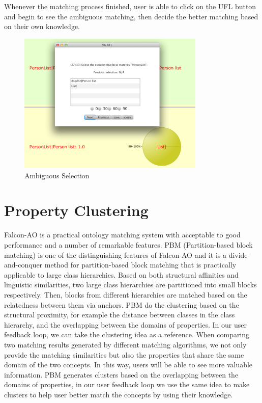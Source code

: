 Whenever the matching process finished, user is able to click on the UFL button and begin to see the ambiguous matching, then decide the better matching based on their own knowledge.

\begin{figure}[htb]
	\centering
	\includegraphics[width=3.5in]{pics/ufl.png}
	\caption{Ambiguous Selection}
	\label{fig:ambiguous_selection}
\end{figure}

\section{Property Clustering} %
\label{sub:property_clustering}
Falcon-AO \cite{hu2008falcon} is a practical ontology matching system with acceptable to good performance and a number of remarkable features. PBM (Partition-based block matching) is one of the distinguishing features of Falcon-AO and it is a divide-and-conquer method for partition-based block matching that is practically applicable to large class hierarchies. Based on both structural affinities and linguistic similarities, two large class hierarchies are partitioned into small blocks respectively. Then, blocks from different hierarchies are matched based on the relatedness between them via anchors. PBM do the clustering based on the structural proximity, for example the distance between classes in the class hierarchy, and the overlapping between the domains of properties. In our user feedback loop, we can take the clustering idea as a reference. When comparing two matching results generated by different matching algorithms, we not only provide the matching similarities but also the properties that share the same domain of the two concepts. In this way, users will be able to see more valuable information. PBM generates clusters based on the overlapping between the domains of properties, in our user feedback loop we use the same idea to make clusters to help user better match the concepts by using their knowledge.\\

